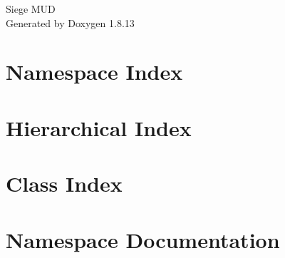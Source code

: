 \documentclass[twoside]{book}
\newcommand{\+}{\discretionary{\mbox{\scriptsize$\hookleftarrow$}}{}{}}
\newcommand{\clearemptydoublepage}{%
  \newpage{\pagestyle{empty}\cleardoublepage}%
}
\begin{document}
\hypersetup{pageanchor=false,
             bookmarksnumbered=true,
             pdfencoding=unicode
            }
\begin{titlepage}
\vspace*{7cm}
\begin{center}%
{\Large Siege M\+UD }\\
\vspace*{1cm}
{\large Generated by Doxygen 1.8.13}\\
\end{center}
\end{titlepage}
\clearemptydoublepage
{}
\tableofcontents
\clearemptydoublepage
{}
\hypersetup{pageanchor=true}

\chapter{Namespace Index}

\chapter{Hierarchical Index}

\chapter{Class Index}

\chapter{Namespace Documentation}















\end{document}
